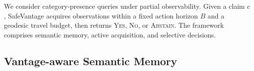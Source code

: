 \documentclass[letterpaper, 10 pt, conference]{ieeeconf}
\newcommand{\method}{SafeVantage}
\newcommand{\support}{\mathrm{support}}
\begin{document}
We consider category-presence queries under partial observability. Given a claim $c$, \method{} acquires observations within a fixed action horizon $B$ and a geodesic travel budget, then returns \textsc{Yes}, \textsc{No}, or \textsc{Abstain}. The framework comprises semantic memory, active acquisition, and selective decisions.


\subsection{Vantage-aware Semantic Memory}
\label{sec:vantage_memory}

\end{document}
